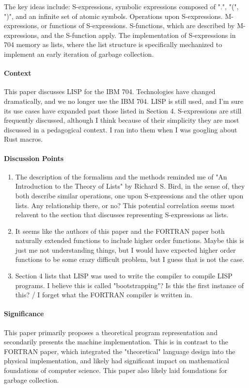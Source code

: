 The key ideas include: S-expressions, symbolic expressions composed of ".", "(",
")", and an infinite set of atomic symbols. Operations upon S-expressions.
M-expressions, or functions of S-expressions. S-functions, which are described
by M-expressions, and the S-function apply. The implementation of S-expressions
in 704 memory as lists, where the list structure is specifically mechanized to
implement an early iteration of garbage collection.
\paragraph{\textbf{Context}}
This paper discusses LISP for the IBM 704. Technologies have changed
dramatically, and we no longer use the IBM 704. LISP is still used, and I'm sure
its use cases have expanded past those listed in Section 4. S-expressions are
still frequently discussed, although I think because of their simplicity they
are most discussed in a pedagogical context. I ran into them when I was googling
about Rust macros.
\paragraph{\textbf{Discussion Points}}
\begin{enumerate}
    \item The description of the formalism and the methods reminded me of "An
    Introduction to the Theory of Lists" by Richard S. Bird, in the sense of,
    they both describe similar operations, one upon S-expressions and the other
    upon lists. Any relationship there, or no? This potential correlation seems
    most relavent to the section that discusses representing S-expressions as
    lists.
    \item It seems like the authors of this paper and the FORTRAN paper both
    naturally extended functions to include higher order functions. Maybe this
    is just me not understanding things, but I would have expected higher order
    functions to be some crazy difficult problem, but I guess that is not the
    case.
    \item Section 4 lists that LISP was used to write the compiler to compile
    LISP programs. I believe this is called "bootstrapping"? Is this the first
    instance of this? / I forget what the FORTRAN compiler is written in.
\end{enumerate}
\paragraph{\textbf{Significance}}
This paper primarily proposes a theoretical program representation and
secondarily presents the machine implementation. This is in contrast to the
FORTRAN paper, which integrated the "theoretical" language design into the
physical implementation, and likely had significant impact on mathematical
foundations of computer science. This paper also likely laid foundations for
garbage collection.


